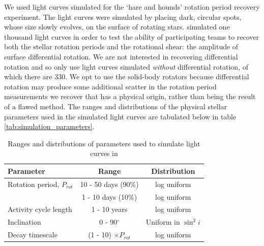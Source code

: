 We used light curves simulated for the \citet{aigrain15} `hare and hounds'
rotation period recovery experiment.
The light curves were simulated by placing dark, circular spots, whose size
slowly evolves, on the surface of rotating stars.
\citep{aigrain15} simulated one thousand light curves in order to test the
ability of participating teams to recover both the stellar rotation periods
and the rotational shear: the amplitude of surface differential rotation.
We are not interested in recovering differential rotation and so only use
light curves simulated {\it without} differential rotation, of which there are
330.
We opt to use the solid-body rotators because differential rotation may
produce some additional scatter in the rotation period measurements we recover
that has a physical origin, rather than being the result of a flawed method.
The ranges and distributions of the physical stellar parameters used in the
simulated light curves are tabulated below in table
\ref{tab:simulation_parameters}.

\begin{table}
\begin{center}
\caption{Ranges and distributions of parameters used to simulate light curves
in \citet{aigrain15}}
\begin{tabular}{lcc}
\hline\hline
    Parameter & Range & Distribution \\
    \hline
    Rotation period, $P_{rot}$ & 10 - 50 days (90\%) & log uniform \\
    & 1 - 10 days (10\%) & log uniform \\
    Activity cycle length & 1 - 10 years & log uniform \\
    Inclination & 0 - 90$^\circ$ & Uniform in $\sin^2i$ \\
    Decay timescale & (1 - 10) $\times P_{rot}$ & log uniform \\
\hline
\end{tabular}
\end{center}
\end{table}
\label{tab:simulation_parameters}

